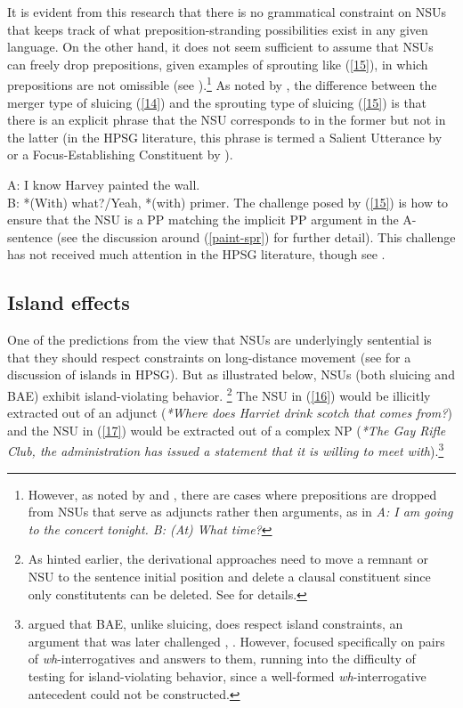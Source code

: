 It is evident from this research that there is no grammatical constraint on NSUs that keeps track of what preposition-stranding possibilities exist in any given language. On the other hand, it does not seem sufficient to assume that NSUs can freely drop prepositions, given examples of sprouting like (\ref{15}), in which prepositions are not omissible (see \citealt{Chung1995}).\footnote{However, as noted by \citet{Ginzburg:Sag:2000} and \citet{Hardt2020}, there are cases where prepositions are dropped from NSUs that serve as adjuncts rather then arguments, as in \textit{A: I am going to the concert tonight. B: (At) What time?}}  As noted by \citet{Chung1995},
the difference between the
merger type of sluicing (\ref{14}) and the sprouting type of sluicing (\ref{15}) is that there is an explicit phrase that the NSU corresponds to in the former but not in the latter (in the HPSG literature, this phrase is termed a Salient Utterance by \citealt[313]{Ginzburg:Sag:2000} or a Focus-Establishing Constituent by \citealt{Ginzburg2012}). 

\ea A: I know Harvey painted the wall.\\B: *(With) what?/Yeah, *(with) primer.\label{15}\z
%
The challenge posed by (\ref{15}) is how to ensure that
the NSU is a PP matching the implicit PP argument in 
the A-sentence (see the discussion
around 
(\ref{paint-spr}) for further detail). This challenge has not received much attention in the HPSG literature, though see \citet{Kim2015}.



\subsection{Island effects}
\label{sec-island-effects}

One of the predictions from the view that NSUs are underlyingly sentential is that they should respect  constraints on long-distance movement (see  for a discussion of islands in HPSG). But as illustrated below, NSUs (both sluicing and BAE) exhibit island-violating behavior.%
\footnote{As hinted earlier, the derivational approaches
need to move a remnant or NSU to the sentence initial position and delete a clausal constituent since only constitutents can be deleted. See \citet{Merchant2001,Merchant2010} for details.} The NSU  in (\ref{16}) would be illicitly extracted out of an adjunct (\textit{*Where does Harriet drink scotch that comes from?}) and the NSU  in (\ref{17}) would be extracted out of a complex NP (\textit{*The Gay Rifle Club, the administration has issued a statement that it is willing to meet with}).\footnote{\citet{Merchant2005a} argued that BAE, unlike sluicing, does respect island constraints, an argument that was later challenged \citep[see, e.g.,][239]{CJ2005a}, \citealt{Griffiths2014}. However, \citet{Merchant2005a} focused specifically on pairs of \emph{wh}-interrogatives and answers to them, running into the difficulty of testing for island-violating behavior, since a well-formed \emph{wh}-interrogative antecedent could not be constructed.}

